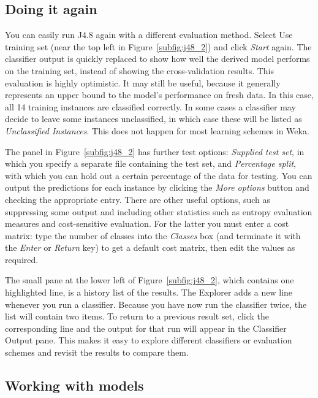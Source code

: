 \subsection{Doing it again}
\label{subsec:doing_it_again}

You can easily run J4.8 again with a different evaluation
method. Select Use training set (near the top left in
Figure~\ref{subfig:j48_2}) and click \textit{Start} again. The
classifier output is quickly replaced to show how well the derived
model performs on the training set, instead of showing the
cross-validation results. This evaluation is highly optimistic. It may
still be useful, because it generally represents an upper bound to the
model’s performance on fresh data. In this case, all 14 training
instances are classified correctly. In some cases a classifier may
decide to leave some instances unclassified, in which case these will
be listed as \textit{Unclassified Instances}. This does not happen for
most learning schemes in Weka.

The panel in Figure~\ref{subfig:j48_2} has further test options:
\textit{Supplied test set}, in which you specify a separate file
containing the test set, and \textit{Percentage split}, with which you
can hold out a certain percentage of the data for testing. You can
output the predictions for each instance by clicking the \textit{More
  options} button and checking the appropriate entry. There are other
useful options, such as suppressing some output and including other
statistics such as entropy evaluation measures and cost-sensitive
evaluation. For the latter you must enter a cost matrix: type the
number of classes into the \textit{Classes} box (and terminate it with
the \textit{Enter} or \textit{Return} key) to get a default cost
matrix, then edit the values as required.

The small pane at the lower left of Figure~\ref{subfig:j48_2}, which
contains one highlighted line, is a history list of the results. The
Explorer adds a new line whenever you run a classifier. Because you
have now run the classifier twice, the list will contain two items. To
return to a previous result set, click the corresponding line and the
output for that run will appear in the Classifier Output pane. This
makes it easy to explore different classifiers or evaluation schemes
and revisit the results to compare them.

\subsection{Working with models}

